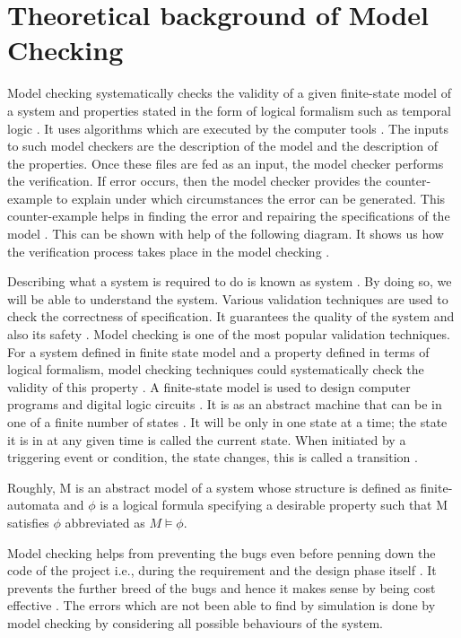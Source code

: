 \documentclass[a4paper,12pt]{report}
\begin{document}
\chapter{ Theoretical background of Model Checking}
\label{Background of Model check}

Model checking systematically checks the validity of a given finite-state model of a system and properties stated in the form of logical formalism such as temporal logic \cite{Palshikar2004}. It uses algorithms which are executed by the computer tools \cite{McMillan2003}. The inputs to such model checkers are the description of the model and the description of the properties. Once these files are fed as an input, the model checker performs the verification. If error occurs, then the model checker provides the counter-example to explain under which circumstances the error can be generated. This counter-example helps in finding the error and repairing the specifications of the model \cite{Wang2007}. This can be shown with help of the following diagram. It shows us how the verification process takes place in the model checking \cite{DanielJackson2004}.  

Describing what a system is required to do is known as system \cite{Wang2007}. By doing so, we will be able to understand the system. Various validation techniques are used to check the correctness of specification. It guarantees the quality of the system and also its safety \cite{Clarke1999}. Model checking is one of the most popular validation techniques. For a system defined in finite state model and a property defined in terms of logical formalism, model checking techniques could systematically check the validity of this property \cite{DawsonEngler}. A finite-state model is used to design computer programs and digital logic circuits \cite{ErichGamma1995}. It is as an abstract machine that can be in one of a finite number of states \cite{M.Davis1962}. It will be only in one state at a time; the state it is in at any given time is called the current state. When initiated by a triggering event or condition, the state changes, this is called a transition \cite{J.M.Wing1996}.

Roughly, M is an abstract model of a system whose structure is defined as finite-automata and $\phi$  is a logical formula specifying a desirable property such that M satisfies $\phi$  abbreviated as $M \models \phi$. 

Model checking helps from preventing the bugs even before penning down the code of the project i.e., during the requirement and the design phase itself \cite{ErichGamma1995}. It prevents the further breed of the bugs and hence it makes sense by being cost effective \cite{Havelund2001}. The errors which are not been able to find by simulation is done by model checking by considering all possible behaviours of the system\cite{Havelund2001}. 
\end{document}
